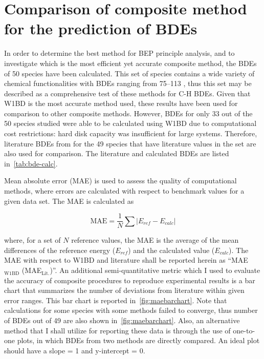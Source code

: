 \section{Comparison of composite method for the prediction of BDEs}

In order to determine the best method for BEP principle analysis, and to investigate which is the most efficient yet accurate composite method, the BDEs of 50 species have been calculated. This set of species contains a wide variety of chemical functionalities with BDEs ranging from 75--113 \kcalmol, thus this set may be described as a comprehensive test of these methods for C-H BDEs. Given that W1BD is the most accurate method used, these results have been used for comparison to other composite methods. However, BDEs for only 33 out of the 50 species studied were able to be calculated using W1BD due to computational cost restrictions: hard disk capacity was insufficient for large systems. Therefore, literature BDEs from \citet{Luo2002} for the 49 species that have literature values in the set are also used for comparison. The literature and calculated BDEs are listed in~\ref{tab:bde-calc}.

\begin{landscape}

\end{landscape}

Mean absolute error (MAE) is used to assess the quality of computational methods, where errors are calculated with respect to benchmark values for a given data set.\cite{Savin2014} The MAE is calculated as

\begin{equation}
  \mathrm{MAE} = \frac{1}{N} \sum | E_{ref} - E_{calc}|
\end{equation}

\noindent where, for a set of $N$ reference values, the MAE is the average of the mean differences of the reference energy ($E_{ref}$) and the calculated value ($E_{calc}$). The MAE with respect to W1BD and literature shall be reported herein as ``MAE$_{\mathrm{W1BD}}$ (MAE$_{\mathrm{Lit.}}$)''. An additional semi-quantitative metric which I used to evaluate the accuracy of composite procedures to reproduce experimental results is a bar chart that summarizes the number of deviations from literature within given error ranges. This bar chart is reported in~\ref{fig:maebarchart}. Note that calculations for some species with some methods failed to converge, thus number of BDEs out of 49 are also shown in~\ref{fig:maebarchart}. Also, an alternative method that I shall utilize for reporting these data is through the use of one-to-one plots, in which BDEs from two methods are directly compared. An ideal plot should have a slope = 1 and y-intercept = 0.

